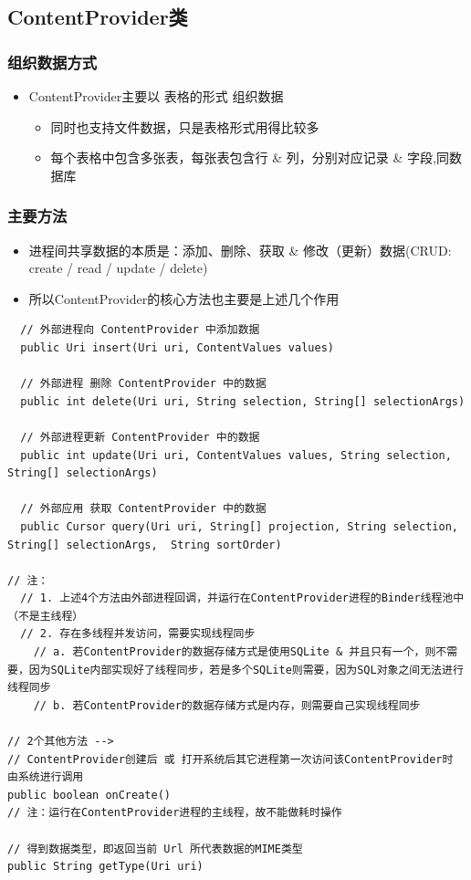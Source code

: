 \documentclass[9pt, b5paper]{article}
\begin{document}
\subsection{ContentProvider类}
\label{sec-1-3}
\subsubsection{组织数据方式}
\label{sec-1-3-1}
\begin{itemize}
\item ContentProvider主要以 表格的形式 组织数据
\begin{itemize}
\item 同时也支持文件数据，只是表格形式用得比较多
\item 每个表格中包含多张表，每张表包含行 \& 列，分别对应记录 \& 字段,同数据库
\end{itemize}
\end{itemize}
\subsubsection{主要方法}
\label{sec-1-3-2}
\begin{itemize}
\item 进程间共享数据的本质是：添加、删除、获取 \& 修改（更新）数据(CRUD: create / read / update / delete)
\item 所以ContentProvider的核心方法也主要是上述几个作用
\end{itemize}
\begin{verbatim}
  // 外部进程向 ContentProvider 中添加数据
  public Uri insert(Uri uri, ContentValues values) 

  // 外部进程 删除 ContentProvider 中的数据
  public int delete(Uri uri, String selection, String[] selectionArgs) 

  // 外部进程更新 ContentProvider 中的数据
  public int update(Uri uri, ContentValues values, String selection, String[] selectionArgs)

  // 外部应用 获取 ContentProvider 中的数据
  public Cursor query(Uri uri, String[] projection, String selection, String[] selectionArgs,  String sortOrder)　 

// 注：
  // 1. 上述4个方法由外部进程回调，并运行在ContentProvider进程的Binder线程池中（不是主线程）
  // 2. 存在多线程并发访问，需要实现线程同步
    // a. 若ContentProvider的数据存储方式是使用SQLite & 并且只有一个，则不需要，因为SQLite内部实现好了线程同步，若是多个SQLite则需要，因为SQL对象之间无法进行线程同步
    // b. 若ContentProvider的数据存储方式是内存，则需要自己实现线程同步

// 2个其他方法 -->
// ContentProvider创建后 或 打开系统后其它进程第一次访问该ContentProvider时 由系统进行调用
public boolean onCreate() 
// 注：运行在ContentProvider进程的主线程，故不能做耗时操作

// 得到数据类型，即返回当前 Url 所代表数据的MIME类型
public String getType(Uri uri)
\end{verbatim}
\end{document}
